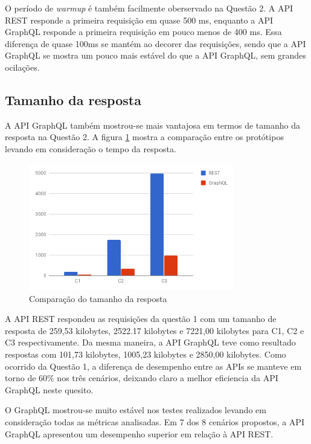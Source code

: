 O período de \textit{warmup} é também facilmente oberservado na Questão 2. A API REST responde a primeira requisição em quase 500 ms, enquanto a API GraphQL responde a primeira requisição em pouco menos de 400 ms. Essa diferença de quase 100ms se mantém ao decorer das requisições, sendo que a API GraphQL se mostra um pouco mais estável do que a API GraphQL, sem grandes ocilações.

\subsection{Tamanho da resposta}

A API GraphQL também mostrou-se mais vantajosa em termos de tamanho da resposta na Questão 2. A figura \ref{fig:q2-size} mostra a comparação entre os protótipos levando em consideração o tempo da resposta.

\begin{figure}[htbp]
    \centering
    \includegraphics[width=0.8\textwidth]{figuras/q1-size.png}
    \caption{Comparação do tamanho da resposta}
    \label{fig:q2-size}
    \author{fonte: Autor}
\end{figure}

A API REST respondeu as requisições da questão 1 com um tamanho de resposta de 259,53 kilobytes, 2522.17 kilobytes e 7221,00 kilobytes para C1, C2 e C3 respectivamente. Da mesma maneira, a API GraphQL teve como resultado respostas com 101,73 kilobytes, 1005,23 kilobytes e 2850,00 kilobytes. Como ocorrido da Questão 1, a diferença de desempenho entre as APIs se manteve em torno de 60\% nos três cenários, deixando claro a melhor eficiencia da API GraphQL neste quesito.

O GraphQL mostrou-se muito estável nos testes realizados levando em consideração todas as métricas analisadas. Em 7 dos 8 cenários propostos, a API GraphQL apresentou um desempenho superior em relação à API REST.